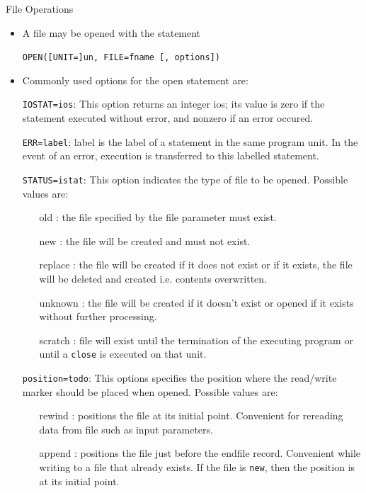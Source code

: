 \documentclass[c,mathserif,compress,xcolor=svgnames]{beamer}
\newcommand{\lstfortran}[1]{\lstinline[language={[90]Fortran},basicstyle=\footnotesize\ttfamily]|#1|}
\begin{document}
\begin{frame}{File Operations}
  \begin{itemize}
    \item A file may be opened with the statement
    \item[]\lstfortran{OPEN([UNIT=]un, FILE=fname [, options])}
    \item Commonly used options for the open statement are:
    \item[]\lstfortran{IOSTAT=ios}: This option returns an integer ios; its value is zero if the statement executed without error, and nonzero if an error occured.
    \item[]\lstfortran{ERR=label}: label is the label of a statement in the same program unit. In the event of an error, execution is transferred to this labelled statement. 
    \item[]\lstfortran{STATUS=istat}: This option indicates the type of file to be opened. Possible values are:
      \begin{itemize}
        \item[old]: the file specified by the file parameter must exist. 
        \item[new]: the file will be created and must not exist. 
        \item[replace]: the file will be created if it does not exist or if it exists, the file will be deleted and created i.e. contents overwritten.
        \item[unknown]: the file will be created if it doesn't exist or opened if it exists without further processing.
        \item[scratch]: file will exist until the termination of the executing program or until a \lstfortran{close} is executed on that unit.
      \end{itemize}
    \item[] \lstfortran{position=todo}: This options specifies the position where the read/write marker should be placed when opened. Possible values are:
      \begin{itemize}
        \item[rewind]: positions the file at its initial point. Convenient for rereading data from file such as input parameters.
        \item[append]: positions the file just before the endfile record. Convenient while writing to a file that already exists. If the file is \texttt{new}, then the position is at its initial point.
      \end{itemize}

\end{itemize}
\end{frame}
\end{document}
